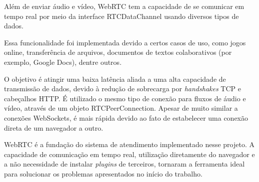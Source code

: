 Além de enviar áudio e vídeo, WebRTC tem a capacidade de se comunicar em tempo real por meio da interface RTCDataChannel  usando diversos tipos de dados. 

Essa funcionalidade foi implementada devido a certos casos de uso, como jogos online, transferência de arquivos, documentos de textos colaborativos (por exemplo, Google Docs), dentre outros.

O objetivo é atingir uma baixa latência aliada a uma alta capacidade de transmissão de dados, devido à redução de sobrecarga por \textit{handshakes} TCP e cabeçalhos HTTP. É utilizado o mesmo tipo de conexão para fluxos de áudio e vídeo, através de um objeto RTCPeerConnection. Apesar de muito similar a conexões WebSockets, é mais rápida devido ao fato de estabelecer uma conexão direta de um navegador a outro.

WebRTC é a fundação do sistema de atendimento implementado nesse projeto. A capacidade de comunicação em tempo real, utilização diretamente do navegador e a não necessidade de instalar \textit{plugins} de terceiros, tornaram a ferramenta ideal para solucionar os problemas apresentados no início do trabalho.


